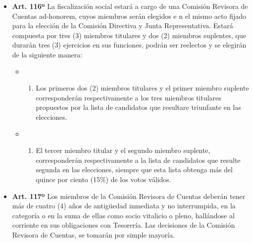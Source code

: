 \documentclass[]{book}
\providecommand{\tightlist}{%
  \setlength{\itemsep}{0pt}\setlength{\parskip}{0pt}}
\begin{document}
\begin{itemize}
\tightlist
\item
  \textbf{Art. 116º} La fiscalización social estará a cargo de una
  Comisión Revisora de Cuentas ad-honorem, cuyos miembros serán elegidos
  e n el mismo acto fijado para la elección de la Comisión Directiva y
  Junta Representativa. Estará compuesta por tres (3) miembros titulares
  y dos (2) miembros suplentes, que durarán tres (3) ejercicios en sus
  funciones, podrán ser reelectos y se elegirán de la siguiente manera:

  \begin{itemize}
  \item
    \begin{enumerate}
    \def\labelenumi{\alph{enumi})}
    \tightlist
    \item
      Los primeros dos (2) miembros titulares y el primer miembro
      suplente corresponderán respectivamente a los tres miembros
      titulares propuestos por la lista de candidatos que resultare
      triunfante en las elecciones.
    \end{enumerate}
  \item
    \begin{enumerate}
    \def\labelenumi{\alph{enumi})}
    \setcounter{enumi}{1}
    \tightlist
    \item
      El tercer miembro titular y el segundo miembro suplente,
      corresponderán respectivamente a la lista de candidatos que
      resulte segunda en las elecciones, siempre que esta lista obtenga
      más del quince por ciento (15\%) de los votos válidos.
    \end{enumerate}
  \end{itemize}
\end{itemize}

\begin{itemize}
\tightlist
\item
  \textbf{Art. 117º} Los miembros de la Comisión Revisora de Cuentas
  deberán tener más de cuatro (4) años de antigüedad inmediata y no
  interrumpida, en la categoría o en la suma de ellas como socio
  vitalicio o pleno, hallándose al corriente en sus obligaciones con
  Tesorería. Las decisiones de la Comisión Revisora de Cuentas, se
  tomarán por simple mayoría.
\end{itemize}
\end{document}
